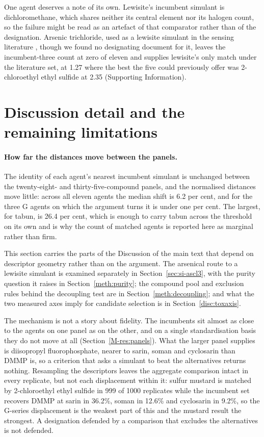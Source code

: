 \documentclass[11pt,a4paper]{article}
\begin{document}
One agent deserves a note of its own. Lewisite's incumbent simulant is
dichloromethane, which shares neither its central element nor its halogen
count, so the failure might be read as an artefact of that comparator rather
than of the designation. Arsenic trichloride, used as a lewisite
simulant in the sensing literature \cite{lee2016lewisite}, though we found
no designating document for it, leaves the incumbent-three count at zero of
eleven and supplies lewisite's only match under the literature set, at 1.27
where the best the five could previously offer was 2-chloroethyl ethyl
sulfide at 2.35 (Supporting Information).


\section{Discussion detail and the remaining limitations}
\label{disc:detail}

\paragraph{How far the distances move between the panels.} The identity of each
agent's nearest incumbent simulant is unchanged between the twenty-eight- and
thirty-five-compound panels, and the normalised distances move little: across
all eleven agents the median shift is 6.2 per cent, and for the three G agents
on which the argument turns it is under one per cent. The largest, for tabun, is
26.4 per cent, which is enough to carry tabun across the threshold on its own
and is why the count of matched agents is reported here as marginal rather than
firm.


This section carries the parts of the Discussion of the main text that
depend on descriptor geometry rather than on the argument. The arsenical route
to a lewisite simulant is examined separately in
Section~\ref{sec:si-ascl3}, with the purity question it raises in
Section~\ref{meth:purity}; the compound pool and exclusion rules behind the
decoupling test are in Section~\ref{meth:decoupling}; and what the two measured
axes imply for candidate selection is in Section~\ref{disc:toxaxis}.

The mechanism is not a story about fidelity. The incumbents sit almost as close
to the agents on one panel as on the other, and on a single standardisation
basis they do not move at all (Section~\ref{M-res:panels}). What the larger panel supplies is
diisopropyl fluorophosphate, nearer to sarin, soman and cyclosarin than DMMP is,
so a criterion that asks a simulant to beat the alternatives returns nothing.
Resampling the descriptors leaves the aggregate comparison intact in every
replicate, but not each displacement within it: sulfur mustard is matched by
2-chloroethyl ethyl sulfide in 999 of 1000 replicates while the incumbent set recovers DMMP
at sarin in 36.2\%, soman in 12.6\% and cyclosarin in 9.2\%, so the G-series
displacement is the weakest part of this and the mustard result the strongest. A designation
defended by a comparison that excludes the alternatives is not defended.
\end{document}
